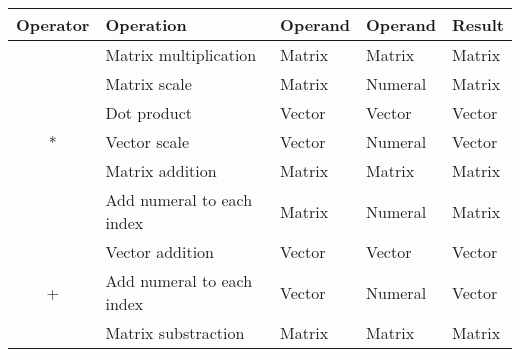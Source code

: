 \begin{table}[ht]
\centering
\begin{tabular}{|c|l|l|l|l|}
\hline
\textbf{Operator}   & \textbf{Operation}                        & \textbf{Operand}                 & \textbf{Operand}                  & \textbf{Result}                 \\ \hline
                    & \cellcolor{gray!40}Matrix multiplication  & \cellcolor{gray!40}Matrix        & \cellcolor{gray!40}Matrix         & \cellcolor{gray!40}Matrix       \\ \cline{2-5} 
                    & Matrix scale                              & Matrix                           & Numeral                           & Matrix                          \\ \cline{2-5}
                    & \cellcolor{gray!40}Dot product            & \cellcolor{gray!40}Vector        & \cellcolor{gray!40}Vector         & \cellcolor{gray!40}Vector       \\ \cline{2-5} 
\multirow{-4}{*}{*} & Vector scale                              & Vector                           & Numeral                           & Vector                          \\ \hline
                    & \cellcolor{gray!40}Matrix addition        & \cellcolor{gray!40}Matrix        & \cellcolor{gray!40}Matrix         & \cellcolor{gray!40}Matrix       \\ \cline{2-5}
                    & Add numeral to each index                 & Matrix                           & Numeral                           & Matrix                          \\ \cline{2-5}
                    & \cellcolor{gray!40}Vector addition        & \cellcolor{gray!40}Vector        & \cellcolor{gray!40}Vector         & \cellcolor{gray!40}Vector       \\ \cline{2-5} 
\multirow{-4}{*}{+} & Add numeral to each index                 & Vector                           & Numeral                           & Vector                          \\ \hline
                    & \cellcolor{gray!40}Matrix substraction    & \cellcolor{gray!40}Matrix        & \cellcolor{gray!40}Matrix         & \cellcolor{gray!40}Matrix       \\ \cline{2-5}

\end{tabular}
\end{table}
